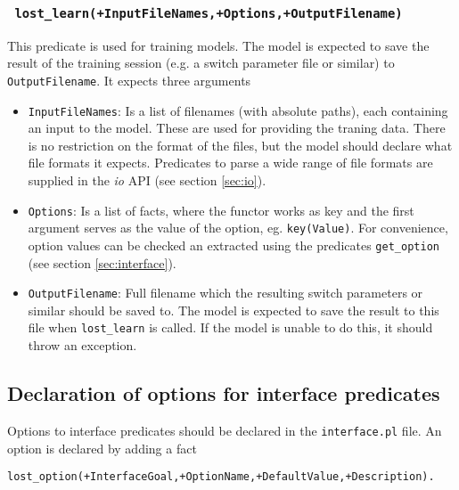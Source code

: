 \documentclass{book}
\begin{document}
\subsubsection{
  \texttt{
    lost\_learn(+InputFileNames,+Options,+OutputFilename)
  }
}

This predicate is used for training models. The model is expected to 
save the result of the training session (e.g. a switch parameter file
or similar) to \texttt{OutputFilename}.  It expects three arguments
\begin{itemize}
\item \texttt{InputFileNames}: Is a list of filenames (with absolute paths),
  each containing an input to the model. These are used for providing 
  the traning data. 
  There is no restriction on the format of the files, but the model
  should declare what file formats it expects.
  Predicates to parse a wide range of file formats are supplied in
  the \emph{io} API (see section \ref{sec:io}). 
\item \texttt{Options}: Is a list of facts, where the functor
  works as key and the first argument serves as the value of the
  option, eg. \texttt{key(Value)}. 
  For convenience, option values can be checked an
  extracted using the predicates \texttt{get\_option} (see section \ref{sec:interface}).
\item \texttt{OutputFilename}: Full filename which the resulting switch
  parameters or similar should be saved to. The model is expected to save
  the result to this file when \texttt{lost\_learn} is called. If the
  model is unable to do this, it should throw an exception.
\end{itemize}

\subsection{Declaration of options for interface predicates}
\label{sec:option_declarations}

Options to interface predicates should be declared in the
\texttt{interface.pl} file. An option is declared by adding a 
fact 
\begin{verbatim}
lost_option(+InterfaceGoal,+OptionName,+DefaultValue,+Description).
\end{verbatim}
\end{document}
